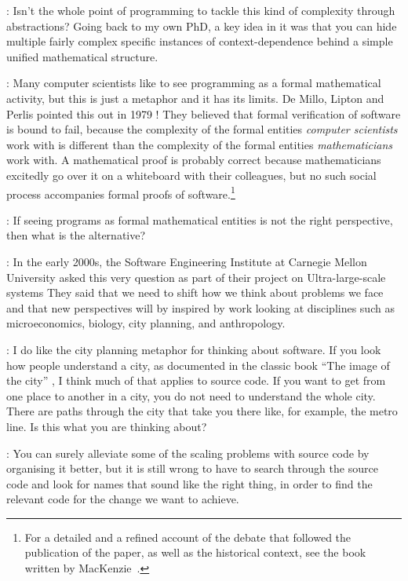 \documentclass[runningheads]{llncs}
\newcommand{\T}{Tomas}
\newcommand{\J}{Joel}
\newcommand{\says}[2][gg]{\vspace{0.5em}\noindent\hangindent=0.5cm{\textsc{#1}}: #2}
\begin{document}
\says[\T]{Isn't the whole point of programming to tackle this kind of complexity through abstractions? Going back to my own PhD, a key idea in it was that you can hide multiple fairly complex specific instances of context-dependence behind a simple unified mathematical structure.}

\says[\J]{Many computer scientists like to see programming as a formal mathematical activity, but this is just a metaphor and it has its limits. De Millo, Lipton and Perlis
pointed this out in 1979 \cite{demillo-1979-proofs}! They believed that formal verification of software is bound to fail, because the complexity of the formal entities \emph{computer scientists} work with is different than the complexity of the formal entities \emph{mathematicians} work with. A mathematical proof is probably correct because mathematicians excitedly go over it on a whiteboard with their colleagues, but no such social process accompanies formal proofs of software.\footnote{For a detailed and a refined account of the debate that followed the publication of the paper, as well as the historical context, see the book written by MacKenzie~\cite{mackenzie-2001-proof}.}}

\says[\T]{If seeing programs as formal mathematical entities is not the right perspective, then what is the alternative?}

\says[\J]{In the early 2000s, the Software Engineering Institute at Carnegie Mellon University asked this very question as part of their project on Ultra-large-scale systems \cite{feiler-2006-ulss} They said that we need to shift how we think about problems we face and that new perspectives will by inspired by work looking at disciplines such as microeconomics, biology, city planning, and anthropology.}

\says[\T]{I do like the city planning metaphor for thinking about software. If you look how people understand a city, as documented in the classic book ``The image of the city'' \cite{lynch-1960-image}, I think much of that applies to source code. If you want to get from one place to another in a city, you do not need to understand the whole city. There are paths through the city that take you there like, for example, the metro line. Is this what you are thinking about?}

\says[\J]{You can surely alleviate some of the scaling problems with source code by organising it better, but it is still wrong to have to search through the source code and look for names that sound like the right thing, in order to find the relevant code for the change we want to achieve.}
\end{document}
